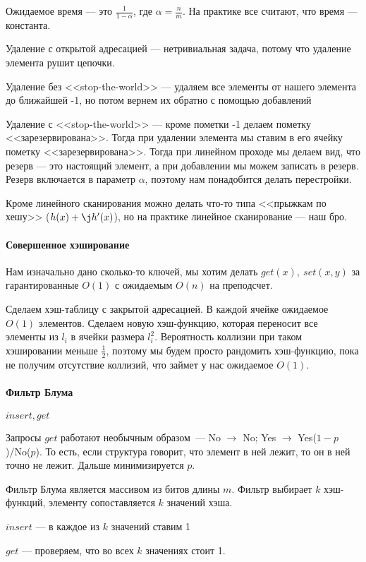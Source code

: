 \documentclass[12pt]{article}
\begin{document}
Ожидаемое время --- это $\frac{1}{1 - \alpha}$, где $\alpha = \frac{n}{m}$. На практике все считают, что время --- константа.

Удаление с открытой адресацией --- нетривиальная задача, потому что удаление элемента рушит цепочки. 

Удаление без <<stop-the-world>> --- удаляем все элементы от нашего элемента до ближайшей -1, но потом вернем их обратно с помощью добавлений

Удаление с <<stop-the-world>> --- кроме пометки -1 делаем пометку <<зарезервирована>>. Тогда при удалении элемента мы ставим в его ячейку пометку <<зарезервирована>>. Тогда при линейном проходе мы делаем вид, что резерв --- это настоящий элемент, а при добавлении мы можем записать в резерв. Резерв включается в параметр $\alpha$, поэтому нам понадобится делать перестройки.

Кроме линейного сканирования можно делать что-то типа <<прыжкам по хешу>> ($h(x) + \j h'(x)$), но на практике линейное сканирование --- наш бро.

\paragraph{Совершенное хэширование}
\hspace{\fill}

Нам изначально дано сколько-то ключей, мы хотим делать $get(x),\ set(x, y)$ за гарантированные $O(1)$ с ожидаемым $O(n)$ на преподсчет.

Сделаем хэш-таблицу с закрытой адресацией. В каждой ячейке ожидаемое $O(1)$ элементов. Сделаем новую хэш-функцию, которая переносит все элементы из $l_i$ в ячейки размера $l_i^2$. Вероятность коллизии при таком хэшировании меньше $\frac{1}{2}$, поэтому мы будем просто рандомить хэш-функцию, пока не получим отсутствие коллизий, что займет у нас ожидаемое $O(1)$.

\paragraph{Фильтр Блума}
\hspace{\fill}

$insert, get$

Запросы $get$ работают необычным образом~--- No $\rightarrow$ No; Yes $\rightarrow$ Yes($1-p$)/No($p$). То есть, если структура говорит, что элемент в ней лежит, то он в ней точно не лежит. Дальше минимизируется $p$.

Фильтр Блума является массивом из битов длины $m$. Фильтр выбирает $k$ хэш-функций, элементу сопоставляется $k$ значений хэша. 

$insert$ --- в каждое из $k$ значений ставим 1

$get$ --- проверяем, что во всех $k$ значениях стоит 1.
\end{document}
